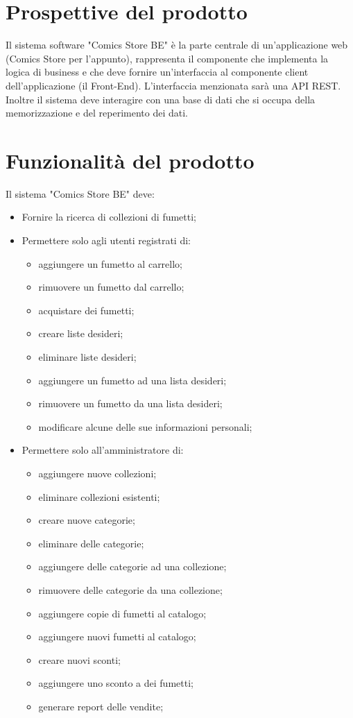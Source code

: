 \documentclass{scrreprt}
\begin{document}
\section{Prospettive del prodotto}
Il sistema software "Comics Store BE" è la parte centrale di un'applicazione web (Comics Store per l'appunto),
rappresenta il componente che implementa la logica di business e che deve fornire un'interfaccia al componente client
dell'applicazione (il Front-End). L'interfaccia menzionata sarà una API REST.
Inoltre il sistema deve interagire con una base di dati che si occupa della memorizzazione e del reperimento dei dati.

\section{Funzionalità del prodotto}
Il sistema "Comics Store BE" deve:
\begin{itemize}
    \item Fornire la ricerca di collezioni di fumetti;
    \item Permettere solo agli utenti registrati di:
        \begin{itemize}
            \item aggiungere un fumetto al carrello;
            \item rimuovere un fumetto dal carrello;
            \item acquistare dei fumetti;
            \item creare liste desideri;
            \item eliminare liste desideri;
            \item aggiungere un fumetto ad una lista desideri;
            \item rimuovere un fumetto da una lista desideri;
            \item modificare alcune delle sue informazioni personali;
        \end{itemize}
    \item Permettere solo all'amministratore di:
        \begin{itemize}
            \item aggiungere nuove collezioni;
            \item eliminare collezioni esistenti;
            \item creare nuove categorie;
            \item eliminare delle categorie;
            \item aggiungere delle categorie ad una collezione;
            \item rimuovere delle categorie da una collezione;
            \item aggiungere copie di fumetti al catalogo;
            \item aggiungere nuovi fumetti al catalogo;
            \item creare nuovi sconti;
            \item aggiungere uno sconto a dei fumetti;
            \item generare report delle vendite;
        \end{itemize}
\end{itemize}
\end{document}
